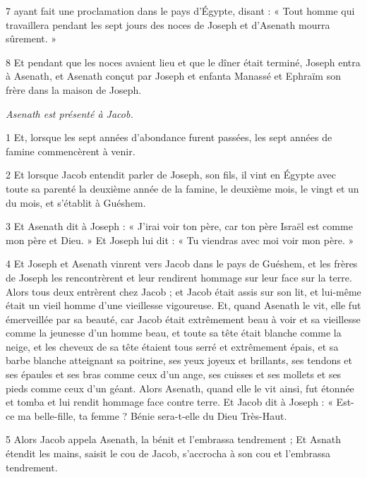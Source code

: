 \par 7 ayant fait une proclamation dans le pays d'Égypte, disant : « Tout homme qui travaillera pendant les sept jours des noces de Joseph et d'Asenath mourra sûrement. »

\par 8 Et pendant que les noces avaient lieu et que le dîner était terminé, Joseph entra à Asenath, et Asenath conçut par Joseph et enfanta Manassé et Ephraïm son frère dans la maison de Joseph.


\par \textit{Asenath est présenté à Jacob.}


\par 1 Et, lorsque les sept années d'abondance furent passées, les sept années de famine commencèrent à venir.

\par 2 Et lorsque Jacob entendit parler de Joseph, son fils, il vint en Égypte avec toute sa parenté la deuxième année de la famine, le deuxième mois, le vingt et un du mois, et s'établit à Guéshem.

\par 3 Et Asenath dit à Joseph : « J'irai voir ton père, car ton père Israël est comme mon père et Dieu. » Et Joseph lui dit : « Tu viendras avec moi voir mon père. »

\par 4 Et Joseph et Asenath vinrent vers Jacob dans le pays de Guéshem, et les frères de Joseph les rencontrèrent et leur rendirent hommage sur leur face sur la terre. Alors tous deux entrèrent chez Jacob ; et Jacob était assis sur son lit, et lui-même était un vieil homme d'une vieillesse vigoureuse. Et, quand Asenath le vit, elle fut émerveillée par sa beauté, car Jacob était extrêmement beau à voir et sa vieillesse comme la jeunesse d'un homme beau, et toute sa tête était blanche comme la neige, et les cheveux de sa tête étaient tous serré et extrêmement épais, et sa barbe blanche atteignant sa poitrine, ses yeux joyeux et brillants, ses tendons et ses épaules et ses bras comme ceux d'un ange, ses cuisses et ses mollets et ses pieds comme ceux d'un géant. Alors Asenath, quand elle le vit ainsi, fut étonnée et tomba et lui rendit hommage face contre terre. Et Jacob dit à Joseph : « Est-ce ma belle-fille, ta femme ? Bénie sera-t-elle du Dieu Très-Haut.

\par 5 Alors Jacob appela Asenath, la bénit et l'embrassa tendrement ; Et Asnath étendit les mains, saisit le cou de Jacob, s'accrocha à son cou et l'embrassa tendrement.

